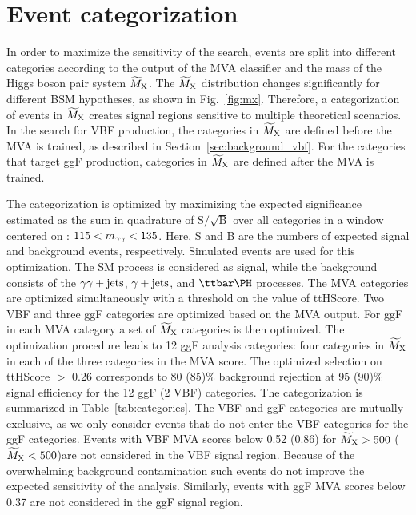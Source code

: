 \documentclass[11pt,twoside,a4paper,cmspaper,final,collab]{cms-tdr}
\begin{document}
\section{Event categorization}
\label{sec:categor}
In order to maximize the sensitivity of the search, events are split into different categories
according to the output of the MVA classifier 
and the mass of the Higgs boson pair system $\widetilde{M}_{\mathrm{X}}$. The $\widetilde{M}_{\mathrm{X}}$ distribution changes significantly for different BSM hypotheses, as shown in Fig.~\ref{fig:mx}. Therefore, a categorization of \HH events in $\widetilde{M}_{\mathrm{X}}$ creates signal regions sensitive to multiple theoretical scenarios. In the search for VBF \HH production, the categories in $\widetilde{M}_{\mathrm{X}}$ are defined before the MVA is trained, as described in Section~\ref{sec:background_vbf}. 
For the categories that target ggF \HH production, categories in $\widetilde{M}_{\mathrm{X}}$ are defined after the MVA is trained.


The categorization is optimized by maximizing the expected significance estimated as the sum in quadrature of $\mathrm{S}/\sqrt{\mathrm{B}}$ over all categories in a window centered on \mH: $115<m_{\gamma\gamma}<135$\GeV. Here, S and B are
the numbers of expected signal and background events, respectively.
 Simulated events are used for this optimization. The SM \HH process is considered as signal, while the background consists of the $\gamma\gamma+\text{jets}$, $\gamma+\text{jets}$, and $\ttH$ processes. The MVA categories are optimized simultaneously with a threshold on the value of \mbox{ttHScore}. Two VBF and three ggF categories are optimized based on the MVA output. For ggF \HH in each MVA category a set of $\widetilde{M}_{\mathrm{X}}$ categories is then optimized. The optimization procedure leads to 12 ggF analysis categories: four categories in $\widetilde{M}_{\mathrm{X}}$ in each of the three categories in the MVA score. The optimized selection on \mbox{ttHScore} $>$ 0.26 corresponds to 80 (85)\% \ttH background rejection at 95 (90)\% signal efficiency for the 12 ggF (2 VBF) categories. 
The categorization is summarized in Table~\ref{tab:categories}. 
The VBF and ggF categories are mutually exclusive, as we only consider events that do not enter the VBF categories for the ggF categories. 
Events with VBF MVA scores below 0.52 (0.86) for $\widetilde{M}_{\mathrm{X}}>500$ ($\widetilde{M}_{\mathrm{X}}<500$)\GeV are not considered in the VBF signal region. Because of the overwhelming background contamination such events do not
improve the expected sensitivity of the analysis. Similarly, events with ggF MVA scores below 0.37 are not considered in the ggF signal region. 
\end{document}
